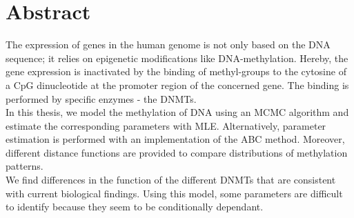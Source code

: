\section*{Abstract}

The expression of genes in the human genome is not only based on the DNA sequence; it relies on epigenetic modifications like DNA-methylation. Hereby, the gene expression is inactivated by the binding of methyl-groups to the cytosine of a \ac{CpG} dinucleotide at the promoter region of the concerned gene. The binding is performed by specific enzymes - the \acp{DNMT}.\\

In this thesis, we model the methylation of DNA using an \ac{MCMC} algorithm and estimate the corresponding parameters with \ac{MLE}. Alternatively, parameter estimation is performed with an implementation of the \ac{ABC} method. Moreover, different distance functions are provided to compare distributions of methylation patterns.\\
We find differences in the function of the different \acp{DNMT} that are consistent with current biological findings. Using this model, some parameters are difficult to identify because they seem to be conditionally dependant.

\newpage
\mbox{}
\newpage